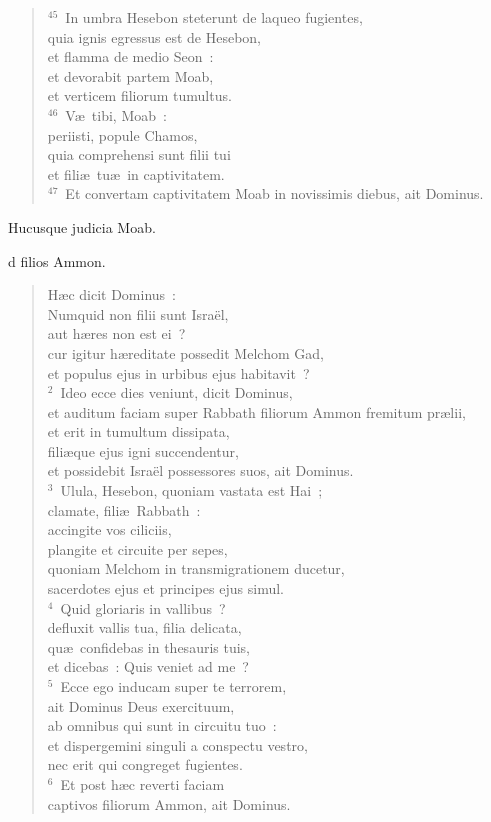 \begin{verse}
${}^{45}$~In umbra Hesebon steterunt de laqueo fugientes,\\ quia ignis egressus est de Hesebon,\\ et flamma de medio Seon~:\\ et devorabit partem Moab,\\ et verticem filiorum tumultus.\\
${}^{46}$~V\ae\ tibi, Moab~:\\ periisti, popule Chamos,\\ quia comprehensi sunt filii tui\\ et fili\ae\ tu\ae\ in captivitatem.\\
${}^{47}$~Et convertam captivitatem Moab in novissimis diebus, ait Dominus.\end{verse}

 Hucusque judicia Moab.

\bchapter
{}d filios Ammon. \begin{verse}H\ae c dicit Dominus~:\\ Numquid non filii sunt Isra\"el,\\ aut h\ae res non est ei~?\\ cur igitur h\ae reditate possedit Melchom Gad,\\ et populus ejus in urbibus ejus habitavit~?\\
${}^{2}$~Ideo ecce dies veniunt, dicit Dominus,\\ et auditum faciam super Rabbath filiorum Ammon fremitum pr\ae lii,\\ et erit in tumultum dissipata,\\ fili\ae que ejus igni succendentur,\\ et possidebit Isra\"el possessores suos, ait Dominus.\\
${}^{3}$~Ulula, Hesebon, quoniam vastata est Hai~;\\ clamate, fili\ae\ Rabbath~:\\ accingite vos ciliciis,\\ plangite et circuite per sepes,\\ quoniam Melchom in transmigrationem ducetur,\\ sacerdotes ejus et principes ejus simul.\\
${}^{4}$~Quid gloriaris in vallibus~?\\ defluxit vallis tua, filia delicata,\\ qu\ae\ confidebas in thesauris tuis,\\ et dicebas~: Quis veniet ad me~?\\
${}^{5}$~Ecce ego inducam super te terrorem,\\ ait Dominus Deus exercituum,\\ ab omnibus qui sunt in circuitu tuo~:\\ et dispergemini singuli a conspectu vestro,\\ nec erit qui congreget fugientes.\\
${}^{6}$~Et post h\ae c reverti faciam\\ captivos filiorum Ammon, ait Dominus.\end{verse}


